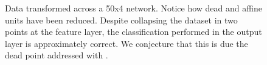 \begin{figure}[h!]
{{    }
  }
  \caption{Data transformed across a 50x4 \SepUnit network. Notice how dead and affine units have been reduced. Despite collapsing the dataset in two points at the feature layer, the classification performed in the output layer is approximately correct. We conjecture that this is due the dead point addressed with \SepPoint.}
    \label{fig:moonsUnitwise}
\end{figure}



\begin{figure}[h!]
  \centering
  \parbox{\textwidth}{
    \parbox{.195\textwidth}{%
    }
    \parbox{.195\textwidth}{%
}}
\end{figure}
